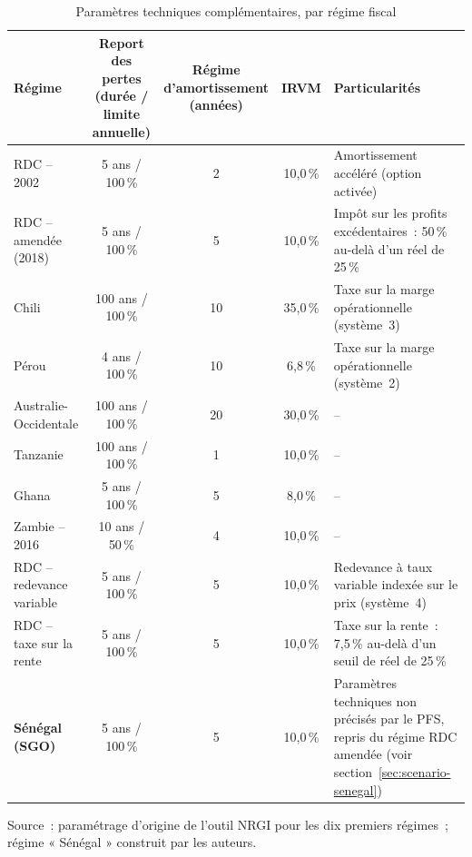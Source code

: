 \begin{table}[H]
\centering
\caption{Paramètres techniques complémentaires, par régime fiscal}
\label{tab:regimes-tech}
\footnotesize
\begin{tabular}{lcccp{4.7cm}}
\toprule
Régime & \makecell{Report des\\pertes (durée /\\limite annuelle)} & \makecell{Régime\\d'amortissement\\(années)} & IRVM & Particularités \\
\midrule
RDC -- 2002              & 5 ans / 100\,\% & 2  & 10,0\,\% & Amortissement accéléré (option activée) \\
RDC -- amendée (2018)    & 5 ans / 100\,\% & 5  & 10,0\,\% & Impôt sur les profits excédentaires~: 50\,\% au-delà d'un \TRI{} réel de 25\,\% \\
Chili                     & 100 ans / 100\,\% & 10 & 35,0\,\% & Taxe sur la marge opérationnelle (système~3) \\
Pérou                     & 4 ans / 100\,\%  & 10 & 6,8\,\%  & Taxe sur la marge opérationnelle (système~2) \\
Australie-Occidentale     & 100 ans / 100\,\% & 20 & 30,0\,\% & -- \\
Tanzanie                  & 100 ans / 100\,\% & 1  & 10,0\,\% & -- \\
Ghana                     & 5 ans / 100\,\%  & 5  & 8,0\,\%  & -- \\
Zambie -- 2016            & 10 ans / 50\,\%  & 4  & 10,0\,\% & -- \\
RDC -- redevance variable & 5 ans / 100\,\% & 5  & 10,0\,\% & Redevance à taux variable indexée sur le prix (système~4) \\
RDC -- taxe sur la rente  & 5 ans / 100\,\% & 5  & 10,0\,\% & Taxe sur la rente~: 7,5\,\% au-delà d'un seuil de \TRI{} réel de 25\,\% \\
\textbf{Sénégal (SGO)}    & 5 ans / 100\,\% & 5  & 10,0\,\% & Paramètres techniques non précisés par le PFS, repris du régime RDC amendée (voir section~\ref{sec:scenario-senegal}) \\
\bottomrule
\end{tabular}

\vspace{0.2cm}
\footnotesize Source~: paramétrage d'origine de l'outil NRGI pour les dix premiers régimes~; régime « Sénégal » construit par les auteurs.
\end{table}

